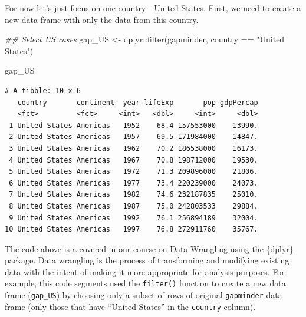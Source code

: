 \documentclass[
  letterpaper,
  DIV=11,
  numbers=noendperiod]{scrreprt}
\newenvironment{Shaded}{\begin{snugshade}}{\end{snugshade}}
\newcommand{\DocumentationTok}[1]{\textcolor[rgb]{0.37,0.37,0.37}{\textit{#1}}}
\newcommand{\FunctionTok}[1]{\textcolor[rgb]{0.28,0.35,0.67}{#1}}
\newcommand{\NormalTok}[1]{\textcolor[rgb]{0.00,0.23,0.31}{#1}}
\newcommand{\OtherTok}[1]{\textcolor[rgb]{0.00,0.23,0.31}{#1}}
\newcommand{\SpecialCharTok}[1]{\textcolor[rgb]{0.37,0.37,0.37}{#1}}
\newcommand{\StringTok}[1]{\textcolor[rgb]{0.13,0.47,0.30}{#1}}
\begin{document}
For now let's just focus on one country - United States. First, we need
to create a new data frame with only the data from this country.

\begin{Shaded}
\begin{Highlighting}[]
\DocumentationTok{\#\# Select US cases}
\NormalTok{gap\_US }\OtherTok{\textless{}{-}}\NormalTok{ dplyr}\SpecialCharTok{::}\FunctionTok{filter}\NormalTok{(gapminder,}
\NormalTok{                        country }\SpecialCharTok{==} \StringTok{"United States"}\NormalTok{)}

\NormalTok{gap\_US}
\end{Highlighting}
\end{Shaded}

\begin{verbatim}
# A tibble: 10 x 6
   country       continent  year lifeExp       pop gdpPercap
   <fct>         <fct>     <int>   <dbl>     <int>     <dbl>
 1 United States Americas   1952    68.4 157553000    13990.
 2 United States Americas   1957    69.5 171984000    14847.
 3 United States Americas   1962    70.2 186538000    16173.
 4 United States Americas   1967    70.8 198712000    19530.
 5 United States Americas   1972    71.3 209896000    21806.
 6 United States Americas   1977    73.4 220239000    24073.
 7 United States Americas   1982    74.6 232187835    25010.
 8 United States Americas   1987    75.0 242803533    29884.
 9 United States Americas   1992    76.1 256894189    32004.
10 United States Americas   1997    76.8 272911760    35767.
\end{verbatim}

\begin{tcolorbox}[enhanced jigsaw, colframe=quarto-callout-note-color-frame, rightrule=.15mm, opacityback=0, breakable, coltitle=black, colbacktitle=quarto-callout-note-color!10!white, bottomrule=.15mm, leftrule=.75mm, toprule=.15mm, arc=.35mm, bottomtitle=1mm, colback=white, left=2mm, opacitybacktitle=0.6, titlerule=0mm, title=\textcolor{quarto-callout-note-color}{\faInfo}\hspace{0.5em}{Reminder}, toptitle=1mm]

The code above is a covered in our course on Data Wrangling using the
\{dplyr\} package. Data wrangling is the process of transforming and
modifying existing data with the intent of making it more appropriate
for analysis purposes. For example, this code segments used the
\texttt{filter()} function to create a new data frame (\texttt{gap\_US})
by choosing only a subset of rows of original \texttt{gapminder} data
frame (only those that have ``United States'' in the \texttt{country}
column).

\end{tcolorbox}
\end{document}
